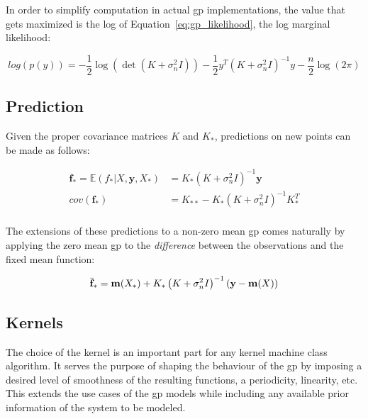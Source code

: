 In order to simplify computation in actual \acrshort{gp} implementations, the
value that gets maximized is the log of Equation~\ref{eq:gp_likelihood}, the log
marginal likelihood:

\begin{equation}\label{eq:gp_log_likelihood}
    log(p(y)) = - \frac{1}{2}\log{\left(
                                \det{\left(
                                        K + \sigma_n^2I
                                \right)}
                            \right)}
                - \frac{1}{2}y^T\left(
                                    K + \sigma_n^2I
                                \right)^{-1}y
                - \frac{n}{2}\log{\left(2\pi\right)}
\end{equation}

\subsection{Prediction}

Given the proper covariance matrices $K$ and $K_*$, predictions on new points
can be made as follows:

\begin{equation}
    \begin{aligned}
        \mathbf{f_*} = \mathbb{E}\left(f_*|X, \mathbf{y}, X_*\right) &=
        K_*\left(K + \sigma_n^2I\right)^{-1}\mathbf{y} \\
        cov(\mathbf{f_*}) &= K_{**} - K_*\left(K +\sigma_n^2I\right)^{-1}K_*^T \\
    \end{aligned}
\end{equation}

The extensions of these predictions to a non-zero mean \acrshort{gp} comes
naturally by applying the zero mean \acrshort{gp} to the \textit{difference}
between the observations and the fixed mean function:

\begin{equation}
    \bar{\mathbf{f}}_* = \mathbf{m}(X_*) + K_*\left(K + 
    \sigma_n^2I\right)^{-1}(\mathbf{y} - \mathbf{m}(X)) \\
\end{equation}

\subsection{Kernels}\label{sec:Kernels}
The choice of the kernel is an important part for any kernel machine class
algorithm. It serves the purpose of shaping the behaviour of the \acrshort{gp}
by imposing a desired level of smoothness of the resulting functions, a
periodicity, linearity, etc. This extends the use cases of the \acrshort{gp}
models while including any available prior information of the system to be
modeled.

